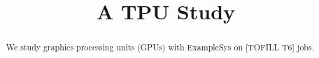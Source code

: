\documentclass{article}
\title{A TPU Study}
\newcommand{\examplesys}{ExampleSys}
\newcommand{\tofill}[1]{[TOFILL #1]}
\begin{document}
\maketitle
\begin{abstract}
We study graphics processing units (GPUs) with \examplesys{} on \tofill{T6} jobs.
\end{abstract}



\end{document}
